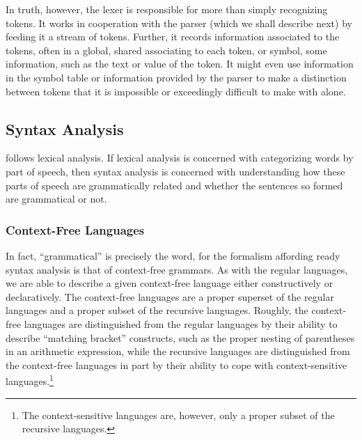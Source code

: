 In truth, however, the lexer is responsible for more than simply recognizing tokens. It works in cooperation with the parser (which we shall describe next) by feeding it a stream of tokens. Further, it records information associated to the tokens, often in a global, shared  associating to each token, or symbol, some information, such as the text or value of the token. It might even use information in the symbol table or information provided by the parser to make a distinction between tokens that it is impossible or exceedingly difficult to make with \regexes alone.

\subsection{Syntax Analysis}
 follows lexical analysis. If lexical analysis is concerned with categorizing words by part of speech, then syntax analysis is concerned with understanding how these parts of speech are grammatically related and whether the sentences so formed are grammatical or not.

\subsubsection{Context-Free Languages}
In fact, ``grammatical'' is precisely the word, for the formalism affording ready syntax analysis is that of context-free grammars. As with the regular languages, we are able to describe a given context-free language either constructively or declaratively. The context-free languages are a proper superset of the regular languages and a proper subset of the recursive languages. Roughly, the context-free languages are distinguished from the regular languages by their ability to describe ``matching bracket'' constructs, such as the proper nesting of parentheses in an arithmetic expression, while the recursive languages are distinguished from the context-free languages in part by their ability to cope with context-sensitive languages.\footnote{The context-sensitive languages are, however, only a proper subset of the recursive languages.}

